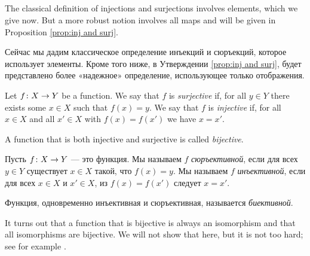 \documentclass[CT4S-EN-RU]{subfiles}
\begin{document}

\subsection{}

\begin{blockENG}
The classical definition of injections and surjections involves elements, which we give now. But a more robust notion involves all maps and will be given in Proposition \ref{prop:inj and surj}.
\end{blockENG}

\begin{blockRUS}
Сейчас мы дадим классическое определение инъекций и сюръекций, которое использует элементы. Кроме того ниже, в Утверждении \ref{prop:inj and surj}, будет представлено более «надежное» определение, использующее только отображения.
\end{blockRUS}

\begin{definitionENG}\label{def:inj,surj,bij}
Let $f\colon X\rightarrow Y$ be a function. We say that $f$ is {\em surjective} if, for all $y\in Y$ there exists some $x\in X$ such that $f(x)=y$. We say that $f$ is {\em injective} if, for all $x\in X$ and all $x'\in X$ with $f(x)=f(x')$ we have $x=x'$.

A function that is both injective and surjective is called {\em bijective}.
\end{definitionENG}

\begin{definitionRUS}\label{def:inj,surj,bij}
Пусть $f\colon X\rightarrow Y$ — это функция. Мы называем $f$ {\em сюръективной}, если для всех $y\in Y$ существует $x\in X$ такой, что $f(x)=y$. Мы называем $f$ {\em инъективной}, если для всех $x\in X$ и $x'\in X$, из $f(x)=f(x')$ следует $x=x'$.

Функция, одновременно инъективная и сюръективная, называется {\em биективной}.
\end{definitionRUS}

\begin{remarkENG}
It turns out that a function that is bijective is always an isomorphism and that all isomorphisms are bijective. We will not show that here, but it is not too hard; see for example \cite[Theorem 5.4]{Big}.
\end{remarkENG}
\end{document}
